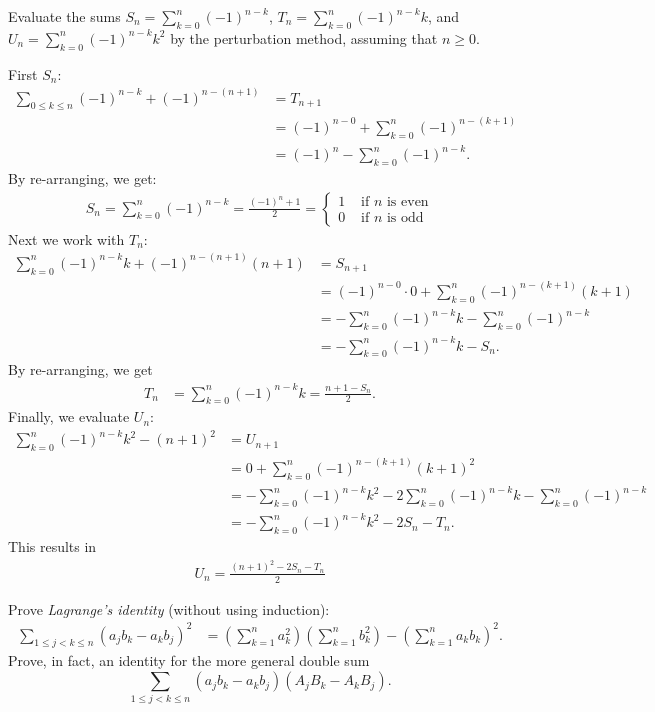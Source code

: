 \documentclass[12pt]{article}
\newenvironment{ex}[2][Exercise]{\begin{trivlist}
		\item[\hskip \labelsep {\bfseries #1}\hskip \labelsep {\bfseries #2.}]}{\end{trivlist}}
\newenvironment{sol}[1][Solution]{\begin{trivlist}
		\item[\hskip \labelsep {\bfseries #1:}]}{\end{trivlist}}
\begin{document}
\begin{ex}{21}
	Evaluate the sums $S_n=\sum_{k=0}^{n}(-1)^{n-k}$, $T_n=\sum_{k=0}^{n}(-1)^{n-k}k$,
	and $U_n=\sum_{k=0}^{n}(-1)^{n-k}k^2$ by the perturbation method, assuming that
	$n\geq 0$.
\end{ex}

\begin{sol}
	First $S_n$:
	\begin{align*}
		\sum_{0\leq k\leq n}(-1)^{n-k}+(-1)^{n-(n+1)}&=T_{n+1}\\
		&=(-1)^{n-0}+\sum_{k=0}^{n}(-1)^{n-(k+1)}\\
		&=(-1)^n-\sum_{k=0}^{n}(-1)^{n-k}.
	\end{align*}
	By re-arranging, we get:
	\begin{align*}
		S_n=\sum_{k=0}^{n}(-1)^{n-k}=\frac{(-1)^n+1}{2}=\begin{cases}
			1 & \text{ if } n \text{ is even}\\
			0 & \text{ if } n \text{ is odd}
		\end{cases}
	\end{align*}
	Next we work with $T_n$:
	\begin{align*}
		\sum_{k=0}^{n}(-1)^{n-k}k+(-1)^{n-(n+1)}(n+1)&=S_{n+1}\\
		&=(-1)^{n-0}\cdot 0+\sum_{k=0}^{n}(-1)^{n-(k+1)}(k+1)\\
		&=-\sum_{k=0}^{n}(-1)^{n-k}k-\sum_{k=0}^{n}(-1)^{n-k}\\
		&=-\sum_{k=0}^{n}(-1)^{n-k}k - S_n.
	\end{align*}
	By re-arranging, we get
	\begin{align*}
		T_n&=\sum_{k=0}^{n}(-1)^{n-k}k=\frac{n+1-S_n}{2}.
	\end{align*}
	Finally, we evaluate $U_n$:
	\begin{align*}
		\sum_{k=0}^{n}(-1)^{n-k}k^2-(n+1)^2&=U_{n+1}\\
		&=0+\sum_{k=0}^{n}(-1)^{n-(k+1)}(k+1)^2\\
		&=-\sum_{k=0}^{n}(-1)^{n-k}k^2-2\sum_{k=0}^{n}(-1)^{n-k}k-\sum_{k=0}^{n}(-1)^{n-k}\\
		&=-\sum_{k=0}^{n}(-1)^{n-k}k^2-2S_n-T_n.
	\end{align*}
	This results in
	\begin{align*}
		U_n=\frac{(n+1)^2-2S_n-T_n}{2}
	\end{align*}
\end{sol}

\begin{ex}{22}
	Prove \emph{Lagrange's identity} (without using induction):
	\begin{align*}
		\sum_{1\leq j < k\leq n}(a_jb_k-a_kb_j)^2
		&=\left(\sum_{k=1}^{n}a_k^2\right)\left(\sum_{k=1}^{n}b_k^2\right)
		-\left(\sum_{k=1}^{n}a_kb_k\right)^2.
	\end{align*}
	Prove, in fact, an identity for the more general double sum
	\[
	\sum_{1\leq j<k\leq n}\left(a_jb_k-a_kb_j\right)\left(A_jB_k-A_kB_j\right).
	\]
\end{ex}
\end{document}
